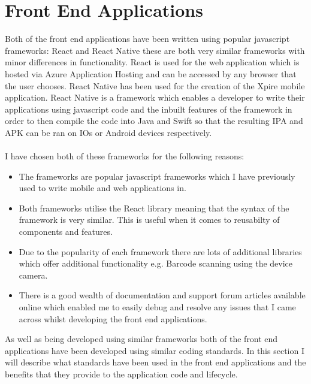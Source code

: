 \documentclass[a4paper,11pt]{report}
\begin{document}
\section{Front End Applications}
Both of the front end applications have been written using popular javascript frameworks: React and React 
Native these are both very similar frameworks with minor differences in functionality. React is used for 
the web application which is hosted via Azure Application Hosting and can be accessed by any browser that
the user chooses. React Native has been used for the creation of the Xpire mobile application. React Native
is a framework which enables a developer to write their applications using javascript code and the inbuilt features of
the framework in order to then compile the code into Java and Swift so that the resulting IPA and APK can be ran 
on IOs or Android devices respectively.
\\
\\
I have chosen both of these frameworks for the following reasons:
\begin{itemize}
    \item The frameworks are popular javascript frameworks which I have previously used to write mobile and web applications in.
    \item Both frameworks utilise the React library meaning that the syntax of the framework is very similar. This is useful 
    when it comes to reusabilty of components and features. 
    \item Due to the popularity of each framework there are lots of additional libraries which offer additional functionality
     e.g. Barcode scanning using the device camera.
    \item There is a good wealth of documentation and support forum articles available online which enabled me to easily debug 
    and resolve any issues that I came across whilst developing the front end applications.
\end{itemize}

As well as being developed using similar frameworks both of the front end applications have been developed using similar coding standards.
 In this section I will describe what standards have been used in the front end applications and the benefits that they provide to the application code and lifecycle.
\end{document}
